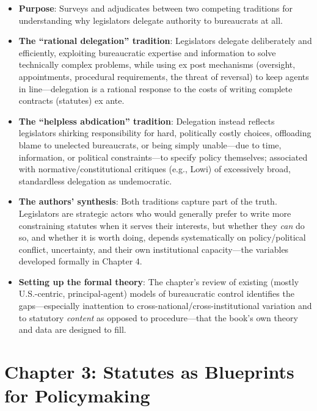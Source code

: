 \documentclass[12pt]{article}
\begin{document}
\begin{itemize}[leftmargin=*, itemsep=4pt]
    \item \textbf{Purpose}: Surveys and adjudicates between two competing traditions for understanding why legislators delegate authority to bureaucrats at all.
    \item \textbf{The ``rational delegation'' tradition}: Legislators delegate deliberately and efficiently, exploiting bureaucratic expertise and information to solve technically complex problems, while using ex post mechanisms (oversight, appointments, procedural requirements, the threat of reversal) to keep agents in line---delegation is a rational response to the costs of writing complete contracts (statutes) ex ante.
    \item \textbf{The ``helpless abdication'' tradition}: Delegation instead reflects legislators shirking responsibility for hard, politically costly choices, offloading blame to unelected bureaucrats, or being simply unable---due to time, information, or political constraints---to specify policy themselves; associated with normative/constitutional critiques (e.g., Lowi) of excessively broad, standardless delegation as undemocratic.
    \item \textbf{The authors' synthesis}: Both traditions capture part of the truth. Legislators are strategic actors who would generally prefer to write more constraining statutes when it serves their interests, but whether they \emph{can} do so, and whether it is worth doing, depends systematically on policy/political conflict, uncertainty, and their own institutional capacity---the variables developed formally in Chapter 4.
    \item \textbf{Setting up the formal theory}: The chapter's review of existing (mostly U.S.-centric, principal-agent) models of bureaucratic control identifies the gaps---especially inattention to cross-national/cross-institutional variation and to statutory \emph{content} as opposed to procedure---that the book's own theory and data are designed to fill.
\end{itemize}

\section{Chapter 3: Statutes as Blueprints for Policymaking}
\end{document}

